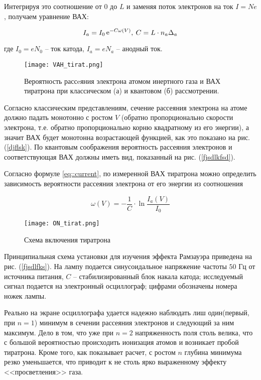 Интегрируя это соотношение от $0$ до $L$ и заменяя поток электронов на ток $I =
Ne$, получаем уравнение ВАХ:

\begin{equation} \label{eq::current}
  I_a = I_0 \mathop{\mathrm e}\nolimits^{ - C \omega(V)}, \: C = L \cdot n_a \Delta_a
\end{equation}

где $I_0 = e N_0$ -- ток катода, $I_a = e N_a$ -- анодный ток.
\begin{wrapfigure}{r}{0.5\textwidth}
  \centering
  \texttt{[image: VAH\_tirat.png]}
  \caption{ {
    Вероятность рассeяния электрона атомом инертного газа и ВАХ тиратрона 
    при классическом (а) и квантовом (б) рассмотрении.
  }}
  \label{img::vah_tirat}
\end{wrapfigure}
Согласно классическим представлениям, сечение рассеяния электрона на атоме
должно падать монотонно с ростом $V$ (обратно пропорционально скорости
электрона, т.е. обратно пропорционально корню квадратному из его энергии), а
значит ВАХ будет монотонна возрастающей функцией, как это показано на рис.
(\ref{djflsk}). По квантовым соображения вероятность рассеяния электронов и
соответствующая ВАХ должны иметь вид, показанный на рис. (\ref{fjsdlkfsd}).

Согласно формуле \eqref{eq::current}, по измеренной ВАХ тиратрона можно
определить зависимость вероятности рассеяния электрона от его энергии из
соотношения

\begin{equation}\label{eq::probability}
  \omega(V) = -\frac{1}{C} \cdot \ln \frac{I_a(V)}{I_0}
\end{equation}

\newpage
\begin{wrapfigure}{r}{0.4\textwidth}
  \centering
  \texttt{[image: ON\_tirat.png]}
  \caption{ {
    Схема включения тиратрона
  }}
  \label{img::on_tirat}
\end{wrapfigure}
Принципиальная схема установки для изучения эффекта Рамзауэра приведена на рис.
(\ref{fjsdlfks}). На лампу подается синусоидальное напряжение частоты $50$ Гц от
источника питания, $C$ -- стабилизированный блок накала катода; исследуемый
сигнал подается на электронный осциллограф; цифрами обозначены номера ножек
лампы.

Реально на экране осциллографа удается надежно наблюдать лиш один(первый, при $n
= 1$) минимум в сечении рассеяния электронов и следующий за ним максимум. Дело в
том, что уже при $n = 2$ напряженность поля столь велика, что с большой
вероятностью происходить ионизация атомов и возникает пробой тиратрона. Кроме
того, как показывает расчет, с ростом $n$ глубина минимума резко уменьшается,
что приводит к не столь ярко выраженному эффекту <<просветления>> газа.

